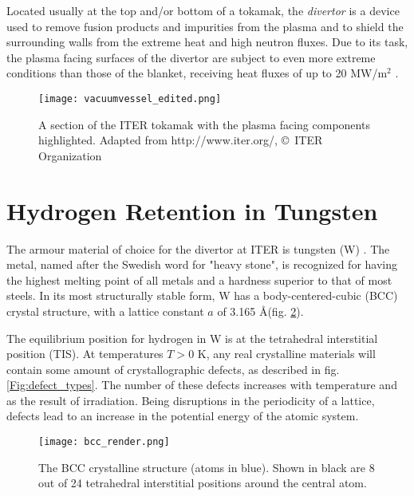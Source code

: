 Located usually at the top and/or bottom of a tokamak, the \textit{divertor} is a device used to remove fusion products and impurities from the plasma and to shield the surrounding walls from the extreme heat and high neutron fluxes. Due to its task, the plasma facing surfaces of the divertor are subject to even more extreme conditions than those of the blanket, receiving heat fluxes of up to 20 MW/m$^2$ \cite{Iter1234Divertor}. 

\begin{figure}[!ht]
\center
\texttt{[image: vacuumvessel\_edited.png]}
\caption{A section of the ITER tokamak with the plasma facing components highlighted. Adapted from http://www.iter.org/, \copyright~ITER Organization}
\label{fig:ITERslice}
\end{figure}

\section{Hydrogen Retention in Tungsten}
The armour material of choice for the divertor at ITER is tungsten (W) \cite{PITTS2013S48}.
The metal, named after the Swedish word for "heavy stone", is recognized for having the highest melting point of all metals and a hardness superior to that of most steels. In its most structurally stable form, W has a body-centered-cubic (BCC) crystal structure, with a lattice constant $a$ of 3.165 \AA (fig. \ref{Fig:bcc}).

The equilibrium position for hydrogen in W is at the tetrahedral interstitial position (TIS). At temperatures $T > 0$ K, any real crystalline materials will contain some amount of crystallographic defects, as described in fig. \ref{Fig:defect_types}. The number of these defects increases with temperature and as the result of irradiation. Being disruptions in the periodicity of a lattice, defects lead to an increase in the potential energy of the atomic system. 

\begin{figure}[!ht]
\center
\texttt{[image: bcc\_render.png]}
\caption{The BCC crystalline structure (atoms in blue). Shown in black are 8 out of 24 tetrahedral interstitial positions around the central atom.}
\label{Fig:bcc}
\end{figure}

